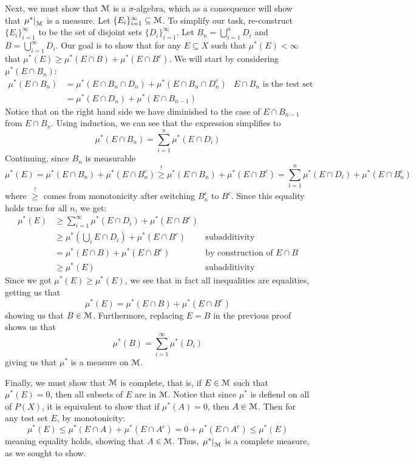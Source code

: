 \documentclass[oneside]{book}
\newcommand{\MM}{\EuScript{M}}
\newcommand{\sse}{\subseteq}
\begin{document}
\begin{Proof}
	 Next, we must show that $\MM$ is a $\sigma$-algebra, which as a consequence will show that $\left.\mu^*\right|_\MM$
	 is a measure. Let $\{E_i\}_{i=1}^\infty \sse \MM$. To simplify our task, re-construct $\{E_i\}_{i=1}^\infty$ to
	 be the set of disjoint sets $\{D_i\}_{i=1}^\infty$. Let $B_n = \bigcup_{i=1}^n D_i$ and $B
	 = \bigcup_{i=1}^\infty D_i$. Our goal is to show that for any $E \sse X$ such that $\mu^*(E) < \infty$ that
	 $\mu^*(E) \ge \mu^*(E\cap B) + \mu^*(E\cap B^c)$. We will start by considering $\mu^*(E\cap B_n)$:
	 \begin{align*}
		 \mu^*(E\cap B_n) &=  \mu^*(E\cap B_n\cap D_n) + \mu^*(E\cap B_n\cap D_n^c) & \text{$E\cap B_n$ is the test
		 set}\\
						  &= \mu^*(E\cap D_n) + \mu^*(E\cap B_{n-1})
	 \end{align*}
	 Notice that on the right hand side we have diminished to the case of $E\cap B_{n-1}$ from $E\cap B_n$. Using
	 induction, we can see that the expression simplifies to
	 \[
		 \mu^*(E\cap B_n) = \sum_{i=1}^n \mu^*(E\cap D_i)
	 \]
	 Continuing, since $B_n$ is measurable
	 \[
		 \mu^*(E)  = \mu^*(E\cap B_n) + \mu^*(E\cap B_n^c) \overset{!}{\ge} \mu^*(E\cap B_n) + \mu^*(E\cap B^c)
		 = \sum_{i=1}^n \mu^*(E\cap D_i) + \mu^*(E\cap B_n^c)
	 \]
	 where $\overset{!}{\ge}$ comes from monotonicity after switching $B_n^c$ to $B^c$. Since this equality holds true
	 for all $n$, we get:
	 \begin{align*}
		 \mu^*(E) &\ge \sum_{i=1}^\infty \mu^*(E\cap D_i) + \mu^*(E\cap B^c)\\
				  &\ge \mu^*\left(\bigcup_i E\cap D_i\right) +\mu^*(E\cap B^c)& \text{subadditivity}\\
				  &= \mu^*(E\cap B) +\mu^*(E\cap B^c) &\text{by construction of $E\cap B$}\\
				  &\ge \mu^*(E) & \text{subadditivity}
	 \end{align*}
	 Since we got $\mu^*(E) \ge \mu^*(E)$, we see that in fact all inequalities are equalities, getting us that
	 \[
		 \mu^*(E) = \mu^*(E\cap B) + \mu^*(E\cap B^c)
	 \]
	 showing us that $B \in \MM$. Furthermore, replacing $E = B$ in the previous proof shows us that
	 \[
		 \mu^*(B) = \sum_{i=1}^\infty \mu^*(D_i)
	 \]
	 giving us that $\mu^*$ is a measure on $\MM$. 

	 Finally, we must show that $\MM$ is complete, that is, if $E \in \MM$ such that $\mu^*(E) = 0$, then all subsets of
	 $E$ are in $\MM$. Notice that since $\mu^*$ is defiend on all of $P(X)$, it is equivalent to show that if $\mu^*(A)
	 = 0$, then $A \in \MM$. Then for any test set $E$, by monotonicity:
	 \[
		 \mu^*(E) \le \mu^*(E\cap A) + \mu^*(E\cap A^c) = 0 + \mu^*(E\cap A^c) \le \mu^*(E)
	 \]
	 meaning equality holds, showing that $A \in \MM$. Thus, $\left. \mu^*\right|_{\MM}$ is a complete measure, as we
	 sought to show. 
\end{Proof}
\end{document}
